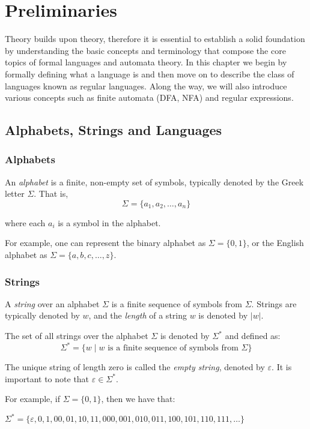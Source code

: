 \chapter{Preliminaries}\label{chap:prelim}
Theory builds upon theory, therefore it is essential to establish a solid foundation by understanding the basic concepts and terminology that compose the core topics of formal languages and automata theory.
In this chapter we begin by formally defining what a language is and then move on to describe the class of languages known as regular languages.
Along the way, we will also introduce various concepts such as finite automata (DFA, NFA) and regular expressions.

\section{Alphabets, Strings and Languages}
\subsection*{Alphabets}

An \emph{alphabet} is a finite, non-empty set of symbols, typically denoted by the Greek letter $\Sigma$. That is,
\[
\Sigma = \{ a_1, a_2, \dots, a_n \}
\]

\noindent where each $a_i$ is a symbol in the alphabet.

For example, one can represent the binary alphabet as $\Sigma = \{ 0, 1 \}$, or the English alphabet as $\Sigma = \{ a, b, c, \ldots, z \}$.

\subsection*{Strings}
A \emph{string} over an alphabet $\Sigma$ is a finite sequence of symbols from $\Sigma$. Strings are typically denoted by $w$, and the \emph{length} of a string $w$ is denoted by $|w|$.

The set of all strings over the alphabet $\Sigma$ is denoted by $\Sigma^*$ and defined as:
\[
\Sigma^* = \{ w \mid w \text{ is a finite sequence of symbols from } \Sigma \}
\]

The unique string of length zero is called the \emph{empty string}, denoted by $\varepsilon$.
It is important to note that $\varepsilon \in \Sigma^*$.

For example, if $\Sigma = \{ 0, 1 \}$, then we have that:
\begin{center}
	$\Sigma^* = \{ \varepsilon, 0, 1, 00, 01, 10, 11, 000, 001, 010, 011, 100, 101, 110, 111, \ldots \}$
\end{center}

